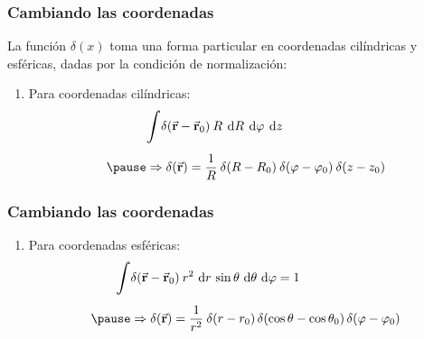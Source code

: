 \documentclass[12pt]{beamer}
\begin{document}
\begin{frame}
\frametitle{Cambiando las coordenadas}
La función $\delta (x)$ toma una forma particular en coordenadas cilíndricas y esféricas, dadas por la condición de normalización:
\pause
{}
\begin{enumerate}[<+->]
\item Para coordenadas cilíndricas:
\begin{eqnarray*}
\begin{aligned}
&\scaleint{6ex} \delta (\va{r} - \va{r}_{0}) \: R \: \dd{R} \: \dd{\varphi} \: \dd{z} \\[0.5em] \pause 
&\Rightarrow \delta (\va{r}) =  \dfrac{1}{R} \: \delta (R - R_{0}) \: \delta (\varphi - \varphi_{0}) \: \delta (z - z_{0})
\end{aligned}
\end{eqnarray*}
\seti
\end{enumerate}
\end{frame}

\begin{frame}
\frametitle{Cambiando las coordenadas}
\begin{enumerate}[<+->]
\conti
\item Para coordenadas esféricas:
\begin{eqnarray*}
\begin{aligned}
\scaleint{6ex} & \delta (\va{r} - \va{r}_{0}) \: r^{2} \, \dd{r} \, \sin \theta \, \dd{\theta} \, \dd{\varphi} = 1 \\[0.5em] \pause
&\Rightarrow \delta (\va{r}) = \dfrac{1}{r^{2}} \: \delta (r - r_{0}) \, \delta (\cos \theta - \cos \theta_{0}) \, \delta (\varphi - \varphi_{0})
\end{aligned}
\end{eqnarray*}
\end{enumerate}
\end{frame}
\end{document}

